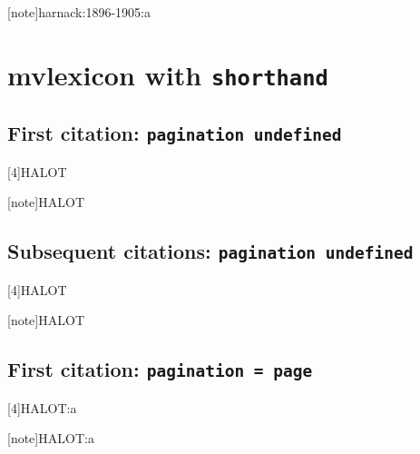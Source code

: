 \documentclass[a4paper]{article}
\begin{document}
[note]{harnack:1896-1905:a}

\cite[note]{harnack:1896-1905:a}

\section{mvlexicon with \texttt{shorthand}}

\subsection{First citation: \texttt{pagination undefined}}

\cite{HALOT}

\citereset
\cite[3:4]{HALOT}

\citereset
\cite[4]{HALOT}

\citereset
{}[4]{HALOT}

\citereset
\AtNextCite{\renewcommand*{\volcitedelim}{\addcomma\space}}
[note]{HALOT}

\citereset
{}

\citereset
\cite[note]{HALOT}

\subsection{Subsequent citations: \texttt{pagination undefined}}

\cite{HALOT}

\cite[3:4]{HALOT}

\cite[4]{HALOT}

[4]{HALOT}


\AtNextCite{\renewcommand*{\volcitedelim}{\addcomma\space}}
[note]{HALOT}

\cite[note]{HALOT}

\subsection{First citation: \texttt{pagination = page}}

\cite{HALOT:a}

\citereset
\cite[3:4]{HALOT:a}

\citereset
\cite[4]{HALOT:a}

\citereset
{}[4]{HALOT:a}

\citereset
{}[note]{HALOT:a}

\citereset
{}
\end{document}
